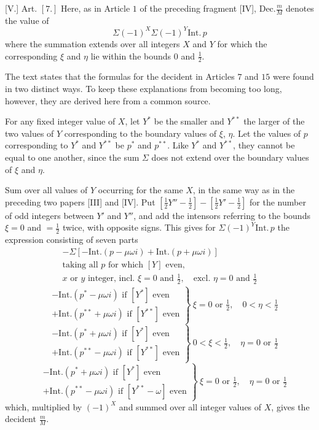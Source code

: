 [V.] Art. $[7.]$ Here, as in Article $1$ of the preceding fragment [IV], $\mathrm{Dec.}\frac mM$ denotes the value of
\[
\Sigma(-1)^X\Sigma(-1)^Y\mathrm{Int.}\,p
\]
where the summation extends over all integers $X$ and $Y$ for which the corresponding $\xi$ and $\eta$ lie within the bounds $0$ and $\tfrac12$.

The text states that the formulas for the decident in Articles $7$ and $15$ were found in two distinct
ways. To keep these explanations from becoming too long, however, they are derived here from a common source.

For any fixed integer value of $X$, let $Y^{*}$ be the smaller and $Y^{**}$ the larger of the two values of $Y$ corresponding to the boundary values of $\xi$, $\eta$. Let the values of $p$ corresponding to $Y^{*}$ and $Y^{**}$ be $p^{*}$ and $p^{**}$. Like $Y^{*}$ and $Y^{**}$, they cannot be equal to one another, since the sum $\Sigma$ does not extend over the boundary values of $\xi$ and $\eta$.

Sum over all values of $Y$ occurring for the same $X$, in the same way as in the preceding two papers [III] and [IV]. Put $[\tfrac12Y''-\tfrac12]-[\tfrac12Y'-\tfrac12]$ for the number of odd integers between $Y'$ and $Y''$, and add the intensors referring to the bounds $\xi=0$ and $=\tfrac12$ twice, with opposite signs. This gives for $\Sigma(-1)^Y\mathrm{Int.}\,p$ the expression consisting of seven parts
\[
\begin{gathered}
-\Sigma[-\mathrm{Int.}(p-\mu\omega i)+\mathrm{Int.}(p+\mu\omega i)]\\
\text{taking all }p\text{ for which }[Y]\text{ even,}\\
x\text{ or }y\text{ integer, incl. }\xi=0\text{ and }\tfrac12,\quad
\text{excl. }\eta=0\text{ and }\tfrac12
\end{gathered}
\]
\[
\left.\begin{aligned}
&-\mathrm{Int.}(p^{*}-\mu\omega i)\text{ if }[Y^{*}]\text{ even}\\
&+\mathrm{Int.}(p^{**}+\mu\omega i)\text{ if }[Y^{**}]\text{ even}
\end{aligned}\right\}\ \xi=0\text{ or }\tfrac12,\quad0<\eta<\tfrac12
\]
\[
\left.\begin{aligned}
&-\mathrm{Int.}(p^{*}+\mu\omega i)\text{ if }[Y^{*}]\text{ even}\\
&+\mathrm{Int.}(p^{**}-\mu\omega i)\text{ if }[Y^{**}]\text{ even}
\end{aligned}\right\}\ 0<\xi<\tfrac12,\quad\eta=0\text{ or }\tfrac12
\]
\[
\left.\begin{aligned}
&-\mathrm{Int.}(p^{*}+\mu\omega i)\text{ if }[Y^{*}]\text{ even}\\
&+\mathrm{Int.}(p^{**}-\mu\omega i)\text{ if }[Y^{**}-\omega]\text{ even}
\end{aligned}\right\}\ \xi=0\text{ or }\tfrac12,\quad\eta=0\text{ or }\tfrac12
\]
which, multiplied by $(-1)^X$ and summed over all integer values of $X$, gives the decident $\frac mM$.

